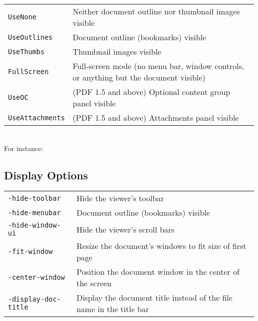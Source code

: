 \documentclass{book}
\begin{document}
\vspace{2mm}
  {\small\begin{tabular}{ll}
    \texttt{UseNone} & \vspace{2mm} \parbox{8cm}{Neither document outline nor thumbnail images visible} \\
    \texttt{UseOutlines} & \vspace{2mm} \parbox{8cm}{Document outline (bookmarks) visible} \\
    \texttt{UseThumbs} & \vspace{2mm} \parbox{8cm}{Thumbnail images visible} \\
    \texttt{FullScreen} & \vspace{2mm} \parbox{8cm}{Full-screen mode (no menu bar, window controls, or anything but the document visible)} \\
    \texttt{UseOC} & \vspace{2mm} \parbox{8cm}{(PDF 1.5 and above) Optional content group panel visible} \\
    \texttt{UseAttachments} & \vspace{2mm} \parbox{8cm}{(PDF 1.5 and above) Attachments panel visible}
  \end{tabular}}\\


  \noindent For instance:

\noindent{}
  

  \subsection{Display Options}
\vspace{2mm}
  {\small\begin{tabular}{ll}
    \texttt{-hide-toolbar} & \vspace{2mm} \parbox{8cm}{Hide the viewer's toolbar} \\
    \texttt{-hide-menubar} & \vspace{2mm} \parbox{8cm}{Document outline (bookmarks) visible} \\
    \texttt{-hide-window-ui} & \vspace{2mm} \parbox{8cm}{Hide the viewer's scroll bars} \\
    \texttt{-fit-window} & \vspace{2mm} \parbox{8cm}{Resize the document's windows to fit size of first page} \\
    \texttt{-center-window} & \vspace{2mm} \parbox{8cm}{Position the document window in the center of the screen} \\
    \texttt{-display-doc-title} & \vspace{2mm} \parbox{8cm}{Display the document title instead of the file name in the title bar}
  \end{tabular}}\\
\end{document}
